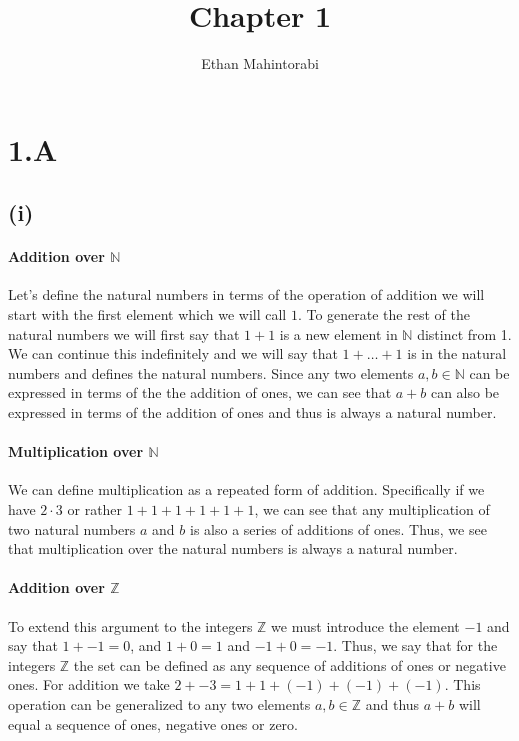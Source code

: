 \documentclass{article}
\begin{document}
  
  \title{Chapter 1}
  \author{Ethan Mahintorabi}
  
  \maketitle

  
  \section*{1.A}
    \subsection*{(i)}
      \paragraph{Addition over $\mathbb{N}$}
      Let's define the natural numbers in terms of the operation of addition we will start with the first element which we will call $1$. To generate the rest of the natural numbers we will first say that $1+1$ is a new element in $\mathbb{N}$ distinct from 1. We can continue this indefinitely and we will say that $1 + \dots + 1$ is in the natural numbers and defines the natural numbers. Since any two elements $a,b \in \mathbb{N}$ can be expressed in terms of the the addition of ones, we can see that $a+b$ can also be expressed in terms of the addition of ones and thus is always a natural number.

      \paragraph{Multiplication over $\mathbb{N}$}
      We can define multiplication as a repeated form of addition. Specifically if we have $2 \cdot 3$ or rather $1+1+1+1+1+1$, we can see that any multiplication of two natural numbers $a$ and $b$ is also a series of additions of ones. Thus, we see that multiplication over the natural numbers is always a natural number.

      \paragraph{Addition over $\mathbb{Z}$}
      To extend this argument to the integers $\mathbb{Z}$ we must introduce the element $-1$ and say that $1 + -1 = 0$, and $1 + 0 = 1$ and $-1 + 0 = -1$. Thus, we say that for the integers $\mathbb{Z}$ the set can be defined as any sequence of additions of ones or negative ones. For addition we take $2 + -3 = 1 + 1 + (-1) + (-1) + (-1)$. This operation can be generalized to any two elements $a,b \in \mathbb{Z}$ and thus $a+b$ will equal a sequence of ones, negative ones or zero.
\end{document}
